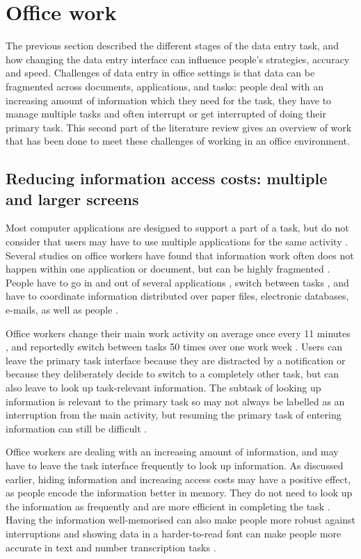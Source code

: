 \documentclass[11pt,oneside]{report}
\begin{document}
\section{Office work}
The previous section described the different stages of the data entry task, and how changing the data entry interface can influence people's strategies, accuracy and speed. Challenges of data entry in office settings is that data can be fragmented across documents, applications, and tasks: people deal with an increasing amount of information which they need for the task, they have to manage multiple tasks and often interrupt or get interrupted of doing their primary task. This second part of the literature review gives an overview of work that has been done to meet these challenges of working in an office environment. 

\subsection{Reducing information access costs: multiple and larger screens}
Most computer applications are designed to support a part of a task, but do not consider that users may have to use multiple applications for the same activity \citep{Cangiano2009}. Several studies on office workers have found that information work often does not happen within one application or document, but can be highly fragmented \citep{Cangiano2009, Czerwinski2004, Mark2005, Sellberg2014}. People have to go in and out of several applications \citep{Cangiano2009, Iqbal2007}, switch between tasks \citep{Czerwinski2004, Mark2005}, and have to coordinate information distributed over paper files, electronic databases, e-mails, as well as people \citep{Sellberg2014}. 

Office workers change their main work activity on average once every 11 minutes \citep{Mark2005}, and reportedly switch between tasks 50 times over one work week \citep{Czerwinski2004}.  Users can leave the primary task interface because they are distracted by a notification or because they deliberately decide to switch to a completely other task, but can also leave to look up task-relevant information.  The subtask of looking up information is relevant to the primary task so may not always be labelled as an interruption from the main activity, but resuming the primary task of entering information can still be difficult \citep{Rule2013}.

Office workers are dealing with an increasing amount of information, and may have to leave the task interface frequently to look up information. As discussed earlier, hiding information and increasing access costs may have a positive effect, as people encode the information better in memory. They do not need to look up the information as frequently and are more efficient in completing the task \citep[e.g.][]{Waldron2011}. Having the information well-memorised can also make people more robust against interruptions \citep{Morgan2009} and showing data in a harder-to-read font can make people more accurate in text and number transcription tasks \citep{Soboczenski2013}.
\end{document}
